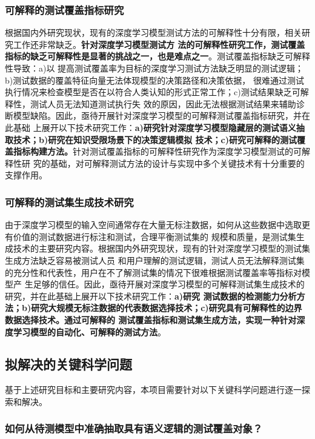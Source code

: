 \subsubsection{可解释的测试覆盖指标研究}
根据国内外研究现状，现有的深度学习模型测试方法的可解释性十分有限，相关研究工作还非常缺乏。\textbf{针对深度学习模型测试方
    法的可解释性研究工作，测试覆盖指标的缺乏可解释性是显著的挑战之一，也是难点之一}。测试覆盖指标缺乏可解释性导致：a)以
提高测试覆盖率为目标的深度学习测试方法缺乏明显的测试逻辑；b)测试数据的覆盖特征向量无法体现模型的决策路径和决策依据，
很难通过测试执行情况来检查模型是否在以符合人类认知的形式正常工作；c)测试结果缺乏可解释性，测试人员无法知道测试执行失
效的原因，因此无法根据测试结果来辅助诊断模型缺陷。因此，亟待开展针对深度学习模型的可解释测试覆盖指标研究，并在此基础
上展开以下技术研究工作：\textbf{a)研究针对深度学习模型隐藏层的测试语义抽取技术；b)研究在知识受限场景下的决策逻辑模拟
    技术；c)研究可解释的测试覆盖指标构建方法。}针对测试覆盖指标的可解释性研究作为深度学习模型测试的可解释性研
究的基础，对可解释测试方法的设计与实现中多个关键技术有十分重要的支撑作用。

\subsubsection{可解释的测试集生成技术研究}
由于深度学习模型的输入空间通常存在大量无标注数据，如何从这些数据中选取更有价值的测试数据进行标注和测试，合理平衡测试集的
规模和质量，是测试集生成技术的主要研究内容。根据国内外研究现状，现有的针对深度学习模型的测试集生成方法缺乏容易被测试人员
和用户理解的测试逻辑，测试人员无法解释测试集的充分性和代表性，用户在不了解测试集的情况下很难根据测试覆盖率等指标对模型产
生足够的信任。因此，亟待开展对深度学习模型的可解释测试集生成技术的研究，并在此基础上展开以下技术研究工作：\textbf{a)研究
    测试数据的检测能力分析方法；b)研究大规模无标注数据的代表数据选择技术；c)研究具有可解释性的边界数据选择技术。通过可解释的
    测试覆盖指标和测试集生成方法，实现一种针对深度学习模型的自动化、可解释的测试方法}。


\subsection{拟解决的关键科学问题}

基于上述研究目标和主要研究内容，本项目需要针对以下关键科学问题进行逐一探索和解决。

\subsubsection{如何从待测模型中准确抽取具有语义逻辑的测试覆盖对象？}

